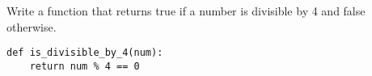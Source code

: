 \begin{blocksection}
\question Write a function that returns true if a number is divisible by 4 and false otherwise.

\begin{solution}[1in]
\begin{lstlisting}
def is_divisible_by_4(num):
    return num % 4 == 0
\end{lstlisting}
\end{solution}
\end{blocksection}
